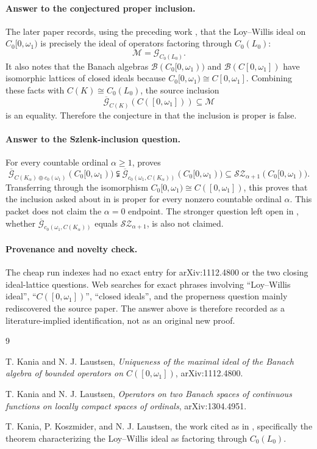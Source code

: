 \documentclass[11pt]{article}
\newcommand{\om}{\omega}
\newcommand{\cG}{\mathscr G}
\newcommand{\cM}{\mathscr M}
\newcommand{\Sz}{\mathscr{S\!Z}}
\begin{document}
\paragraph{Answer to the conjectured proper inclusion.}
The later paper records, using the preceding work \cite{KL2011,KKL}, that the
Loy--Willis ideal on \(C_0[0,\om_1)\) is precisely the ideal of operators
factoring through \(C_0(L_0)\):
\[
  \cM=\cG_{C_0(L_0)}.
\]
It also notes that the Banach algebras
\(\mathscr B(C_0[0,\om_1))\) and \(\mathscr B(C[0,\om_1])\) have isomorphic
lattices of closed ideals because \(C_0[0,\om_1)\cong C[0,\om_1]\).
Combining these facts with \(C(K)\cong C_0(L_0)\), the source inclusion
\[
 \overline{\cG}_{C(K)}(C([0,\om_1]))\subseteq \cM
\]
is an equality. Therefore the conjecture in \cite{KL2011} that the inclusion
is proper is false.

\paragraph{Answer to the Szlenk-inclusion question.}
For every countable ordinal \(\alpha\ge 1\), \cite{KL2014} proves
\[
 \overline{\cG}_{C(K_\alpha)\oplus c_0(\om_1)}(C_0[0,\om_1))
 \subsetneqq
 \overline{\cG}_{c_0(\om_1,C(K_\alpha))}(C_0[0,\om_1))
 \subseteq
 \Sz_{\alpha+1}(C_0[0,\om_1)).
\]
Transferring through the isomorphism \(C_0[0,\om_1)\cong C([0,\om_1])\),
this proves that the inclusion asked about in \cite{KL2011} is proper for
every nonzero countable ordinal \(\alpha\). This packet does not claim the
\(\alpha=0\) endpoint. The stronger question left open in \cite{KL2014},
whether
\(\overline{\cG}_{c_0(\om_1,C(K_\alpha))}\) equals \(\Sz_{\alpha+1}\), is
also not claimed.

\paragraph{Provenance and novelty check.}
The cheap run indexes had no exact entry for arXiv:1112.4800 or the two
closing ideal-lattice questions. Web searches for exact phrases involving
``Loy--Willis ideal'', ``\(C([0,\omega_1])\)'', ``closed ideals'', and the
properness question mainly rediscovered the source paper. The answer above is
therefore recorded as a literature-implied identification, not as an original
new proof.

\begin{thebibliography}{9}

T. Kania and N. J. Laustsen,
\emph{Uniqueness of the maximal ideal of the Banach algebra of bounded
operators on \(C([0,\omega_1])\)}, arXiv:1112.4800.

T. Kania and N. J. Laustsen,
\emph{Operators on two Banach spaces of continuous functions on locally
compact spaces of ordinals}, arXiv:1304.4951.

T. Kania, P. Koszmider, and N. J. Laustsen,
the work cited as \cite{KKL} in \cite{KL2014}, specifically the theorem
characterizing the Loy--Willis ideal as factoring through \(C_0(L_0)\).

\end{thebibliography}
\end{document}
